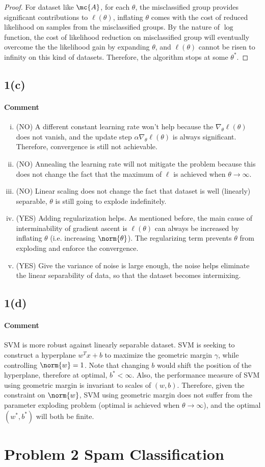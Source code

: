 \documentclass[11pt]{article}
\begin{document}
\begin{proof}
		For dataset like $\mc{A}$, for each $\theta$, the misclassified group provides significant contributions to $\ell(\theta)$, inflating $\theta$ comes with the cost of reduced likelihood on samples from the misclassified groups. By the nature of $\log$ function, the cost of likelihood reduction on misclassified group will eventually overcome the the likelihood gain by expanding $\theta$, and $\ell(\theta)$ cannot be risen to infinity on this kind of datasets. Therefore, the algorithm stops at some $\theta^*$.
	\end{proof}
	\newpage
	\subsection{1(c)}
		\paragraph{Comment}
		\begin{enumerate}[(i)]
			\item (NO) A different constant learning rate won't help because the $\nabla_\theta \ell(\theta)$ does not vanish, and the update step $\alpha \nabla_\theta \ell(\theta)$ is always significant. Therefore, convergence is still not achievable.
			\item (NO) Annealing the learning rate will not mitigate the problem because this does not change the fact that the maximum of $\ell$ is achieved when $\theta \to \infty$.
			\item (NO) Linear scaling does not change the fact that dataset is well (linearly) separable, $\theta$ is still going to explode indefinitely.
			\item (YES) Adding regularization helps. As mentioned before, the main cause of interminability of gradient ascent is $\ell(\theta)$ can always be increased by inflating $\theta$ (i.e. increasing $\norm{\theta}$). The regularizing term prevents $\theta$ from exploding and enforce the convergence.
			\item (YES) Give the variance of noise is large enough, the noise helps eliminate the linear separability of data, so that the dataset becomes intermixing.
		\end{enumerate}
	
	\newpage
	\subsection{1(d)}
	\paragraph{Comment} SVM is more robust against linearly separable dataset. SVM is seeking to construct a hyperplane $w^T x + b$ to maximize the geometric margin $\gamma$, while controlling $\norm{w} = 1$. Note that changing $b$ would shift the position of the hyperplane, therefore at optimal, $b^* < \infty$. Also, the performance measure of SVM using geometric margin is invariant to scales of $(w, b)$. Therefore, given the constraint on $\norm{w}$, SVM using geometric margin does not suffer from the parameter exploding problem (optimal is achieved when $\theta \to \infty$), and the optimal $(w^*, b^*)$ will both be finite.
	
	\newpage
	\section{Problem 2 Spam Classification}
\end{document}
